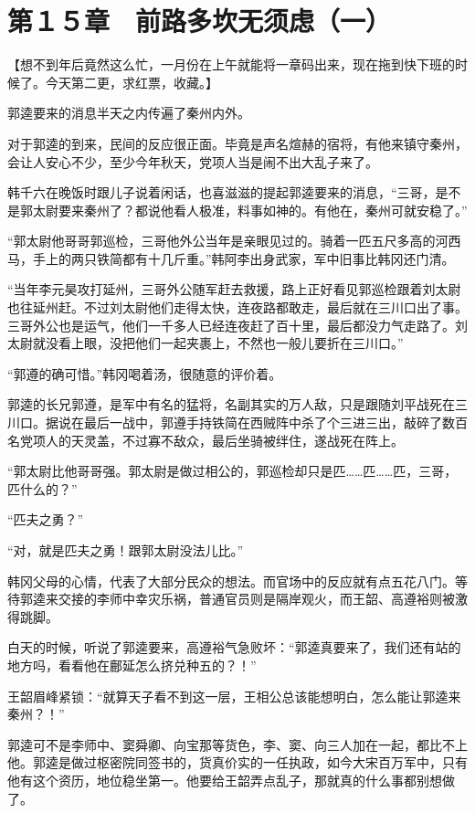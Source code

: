 \section{第１５章　前路多坎无须虑（一）}

【想不到年后竟然这么忙，一月份在上午就能将一章码出来，现在拖到快下班的时候了。今天第二更，求红票，收藏。】

郭逵要来的消息半天之内传遍了秦州内外。

对于郭逵的到来，民间的反应很正面。毕竟是声名煊赫的宿将，有他来镇守秦州，会让人安心不少，至少今年秋天，党项人当是闹不出大乱子来了。

韩千六在晚饭时跟儿子说着闲话，也喜滋滋的提起郭逵要来的消息，“三哥，是不是郭太尉要来秦州了？都说他看人极准，料事如神的。有他在，秦州可就安稳了。”

“郭太尉他哥哥郭巡检，三哥他外公当年是亲眼见过的。骑着一匹五尺多高的河西马，手上的两只铁简都有十几斤重。”韩阿李出身武家，军中旧事比韩冈还门清。

“当年李元昊攻打延州，三哥外公随军赶去救援，路上正好看见郭巡检跟着刘太尉也往延州赶。不过刘太尉他们走得太快，连夜路都敢走，最后就在三川口出了事。三哥外公也是运气，他们一千多人已经连夜赶了百十里，最后都没力气走路了。刘太尉就没看上眼，没把他们一起夹裹上，不然也一般儿要折在三川口。”

“郭遵的确可惜。”韩冈喝着汤，很随意的评价着。

郭逵的长兄郭遵，是军中有名的猛将，名副其实的万人敌，只是跟随刘平战死在三川口。据说在最后一战中，郭遵手持铁简在西贼阵中杀了个三进三出，敲碎了数百名党项人的天灵盖，不过寡不敌众，最后坐骑被绊住，遂战死在阵上。

“郭太尉比他哥哥强。郭太尉是做过相公的，郭巡检却只是匹……匹……匹，三哥，匹什么的？”

“匹夫之勇？”

“对，就是匹夫之勇！跟郭太尉没法儿比。”

韩冈父母的心情，代表了大部分民众的想法。而官场中的反应就有点五花八门。等待郭逵来交接的李师中幸灾乐祸，普通官员则是隔岸观火，而王韶、高遵裕则被激得跳脚。

白天的时候，听说了郭逵要来，高遵裕气急败坏：“郭逵真要来了，我们还有站的地方吗，看看他在鄜延怎么挤兑种五的？！”

王韶眉峰紧锁：“就算天子看不到这一层，王相公总该能想明白，怎么能让郭逵来秦州？！”

郭逵可不是李师中、窦舜卿、向宝那等货色，李、窦、向三人加在一起，都比不上他。郭逵是做过枢密院同签书的，货真价实的一任执政，如今大宋百万军中，只有他有这个资历，地位稳坐第一。他要给王韶弄点乱子，那就真的什么事都别想做了。

